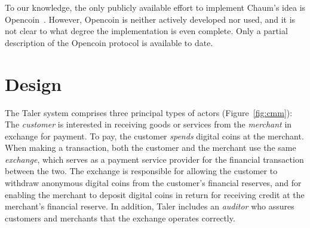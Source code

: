 \documentclass{llncs}
\begin{document}
%
%

To our knowledge, the only publicly available effort to implement
Chaum's idea is Opencoin~\cite{dent2008extensions}.  However, Opencoin
is neither actively developed nor used, and it is not clear
to what degree the implementation is even complete.  Only a partial
description of the Opencoin protocol is available to date.





\section{Design}

The Taler system comprises three principal types of actors
(Figure~\ref{fig:cmm}): The \emph{customer} is interested in receiving
goods or services from the \emph{merchant} in exchange for payment.
To pay, the customer {\em spends} digital coins at the merchant.  When
making a transaction, both the customer and the merchant use the same
\emph{exchange}, which serves as a payment service provider for the
financial transaction between the two.  The exchange is responsible
for allowing the customer to withdraw anonymous digital coins from the
customer's financial reserves, and for enabling the merchant to
deposit digital coins in return for receiving credit at the merchant's
financial reserve.  In addition, Taler includes an \emph{auditor} who
assures customers and merchants that the exchange operates correctly.
\end{document}

